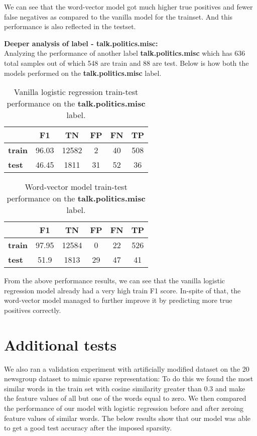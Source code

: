 We can see that the word-vector model got much higher true positives and fewer false negatives as compared to the vanilla model for the trainset. And this performance is also reflected in the testset.

\noindent \textbf{Deeper analysis of label - talk.politics.misc:}\\

Analyzing the performance of another label \textbf{talk.politics.misc} which has 636 total samples out of which 548 are train and 88 are test. Below is how both the models performed on the \textbf{talk.politics.misc} label.

\begin{table}[htbp]
\centering
\begin{tabular}{l|c|c|c|c|c|}
 & \textbf{F1} & \textbf{TN} & \textbf{FP} & \textbf{FN} & \textbf{TP} \\ \hline
\textbf{train} & 96.03 & 12582 & 2 & 40 & 508 \\
\textbf{test} & 46.45 & 1811 & 31 & 52 & 36
\end{tabular}
\caption{\label{tab:widgets}Vanilla logistic regression train-test performance on the \textbf{talk.politics.misc} label.}
\end{table}


\begin{table}[htbp]
\centering
\begin{tabular}{l|c|c|c|c|c|}
 & \textbf{F1} & \textbf{TN} & \textbf{FP} & \textbf{FN} & \textbf{TP} \\ \hline
\textbf{train} & 97.95 & 12584 & 0 & 22 & 526 \\
\textbf{test} & 51.9 & 1813 & 29 & 47 & 41
\end{tabular}
\caption{\label{tab:widgets}Word-vector model train-test performance on the \textbf{talk.politics.misc} label.}
\end{table}

From the above performance results, we can see that the vanilla logistic regression model already had a very high train F1 score. In-spite of that, the word-vector model managed to further improve it by predicting more true positives correctly.\\

\newpage
\section{Additional tests}

We also ran a validation experiment with artificially modified dataset on the 20 newsgroup dataset to mimic sparse representation: To do this we found the most similar words in the train set with cosine similarity greater than 0.3 and make the feature values of all but one of the words equal to zero. We then compared the performance of our model with logistic regression before and after zeroing feature values of similar words. The below results show that our model was able to get a good test accuracy after the imposed sparsity.\\


